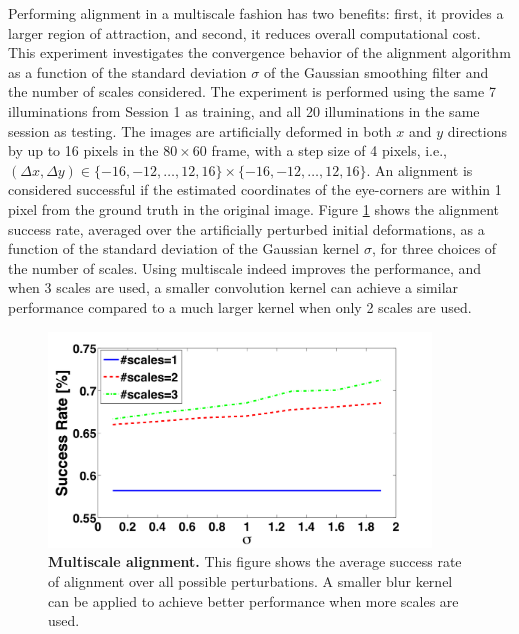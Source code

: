 Performing alignment in a multiscale fashion has two benefits: first, it
provides a larger region of attraction, and second, it reduces overall
computational cost. This experiment investigates the convergence behavior of
the alignment algorithm as a function of the standard deviation $\sigma$ of the
Gaussian smoothing filter and the number of scales considered.
The experiment is performed using the same 7 illuminations from
Session 1 as training, and all 20 illuminations in the same
session as testing. The images are artificially deformed in
both $x$ and $y$ directions by up to 16 pixels in the
$80\times 60$ frame, with a step size of 4 pixels, i.e.,
$(\Delta x, \Delta y) \in \{-16,-12,\ldots,12,16\} \times
\{-16,-12,\ldots,12,16\}$. An alignment is considered
successful if the estimated coordinates of the eye-corners
are within 1 pixel from the ground truth in the original
image.  Figure \ref{fig:multiscale} shows the
alignment success rate, averaged over the artificially
perturbed initial deformations, as a function of the
standard deviation of the Gaussian kernel $\sigma$, for
three choices of the number of scales. 
Using multiscale indeed improves the performance, and when
3 scales are used, a smaller convolution kernel can achieve
a similar performance compared to a much larger kernel when
only 2 scales are used.
\begin{figure}
\centering
\includegraphics[width=4in]{figures_pami/multiscale.png}
\caption{\small{\bf Multiscale alignment.} This figure shows the average success rate of 
alignment over all possible perturbations. A smaller blur kernel can be applied to achieve 
better performance when more scales are used.}
\label{fig:multiscale}
\end{figure}

